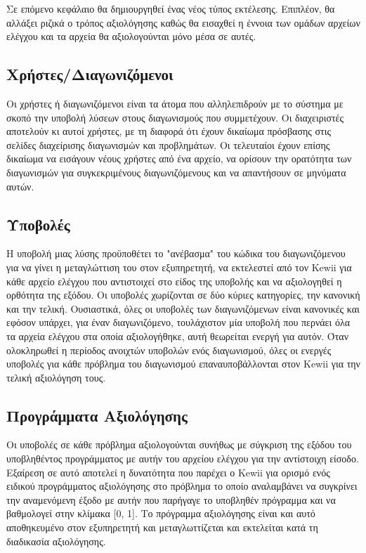 \documentclass[diploma]{softlab-thesis}
\begin{document}
\bigskip

Σε επόμενο κεφάλαιο θα δημιουργηθεί ένας νέος τύπος εκτέλεσης. Επιπλέον, θα
αλλάξει ριζικά ο τρόπος αξιολόγησης καθώς θα εισαχθεί η έννοια των ομάδων
αρχείων ελέγχου και τα αρχεία θα αξιολογούνται μόνο μέσα σε αυτές.

\subsection{Χρήστες/Διαγωνιζόμενοι}

Οι χρήστες ή διαγωνιζόμενοι είναι τα άτομα που αλληλεπιδρούν με το σύστημα με
σκοπό την υποβολή λύσεων στους διαγωνισμούς που συμμετέχουν. Οι διαχειριστές
αποτελούν κι αυτοί χρήστες, με τη διαφορά ότι έχουν δικαίωμα πρόσβασης στις
σελίδες διαχείρισης διαγωνισμών και προβλημάτων. Οι τελευταίοι έχουν επίσης
δικαίωμα να εισάγουν νέους χρήστες από ένα αρχείο, να ορίσουν την ορατότητα των
διαγωνισμών για συγκεκριμένους διαγωνιζόμενους και να απαντήσουν σε μηνύματα
αυτών.

\subsection{Υποβολές}

Η υποβολή μιας λύσης προϋποθέτει το "ανέβασμα" του κώδικα του διαγωνιζόμενου για
να γίνει η μεταγλώττιση του στον εξυπηρετητή, να εκτελεστεί από τον Kewii για
κάθε αρχείο ελέγχου που αντιστοιχεί στο είδος της υποβολής και να αξιολογηθεί η
ορθότητα της εξόδου. Οι υποβολές χωρίζονται σε δύο κύριες κατηγορίες, την
κανονική και την τελική. Ουσιαστικά, όλες οι υποβολές των διαγωνιζόμενων είναι
κανονικές και εφόσον υπάρχει, για έναν διαγωνιζόμενο, τουλάχιστον μία υποβολή
που περνάει όλα τα αρχεία ελέγχου στα οποία αξιολογήθηκε, αυτή θεωρείται ενεργή
για αυτόν. Όταν ολοκληρωθεί η περίοδος ανοιχτών υποβολών ενός διαγωνισμού, όλες
οι ενεργές υποβολές για κάθε πρόβλημα του διαγωνισμού επαναυποβάλλονται στον
Kewii για την τελική αξιολόγηση τους.

\subsection{Προγράμματα Αξιολόγησης}

Οι υποβολές σε κάθε πρόβλημα αξιολογούνται συνήθως με σύγκριση της εξόδου του
υποβληθέντος προγράμματος με αυτήν του αρχείου ελέγχου για την αντίστοιχη
είσοδο. Εξαίρεση σε αυτό αποτελεί η δυνατότητα που παρέχει ο Kewii για ορισμό
ενός ειδικού προγράμματος αξιολόγησης στο πρόβλημα το οποίο αναλαμβάνει να
συγκρίνει την αναμενόμενη έξοδο με αυτήν που παρήγαγε το υποβληθέν πρόγραμμα
και να βαθμολογεί στην κλίμακα [0, 1]. Το πρόγραμμα αξιολόγησης είναι και αυτό
αποθηκευμένο στον εξυπηρετητή και μεταγλωττίζεται και εκτελείται κατά τη
διαδικασία αξιολόγησης.
\end{document}
